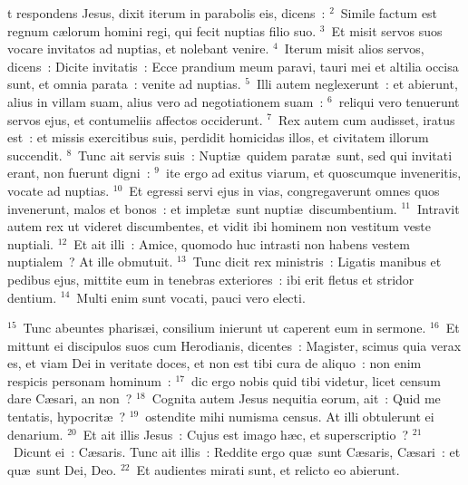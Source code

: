 \bchapter
{}t respondens Jesus, dixit iterum in parabolis eis, dicens~:
${}^{2}$~Simile factum est regnum c\ae lorum homini regi, qui fecit nuptias filio suo.
${}^{3}$~Et misit servos suos vocare invitatos ad nuptias, et nolebant venire.
${}^{4}$~Iterum misit alios servos, dicens~: Dicite invitatis~: Ecce prandium meum paravi, tauri mei et altilia occisa sunt, et omnia parata~: venite ad nuptias.
${}^{5}$~Illi autem neglexerunt~: et abierunt, alius in villam suam, alius vero ad negotiationem suam~:
${}^{6}$~reliqui vero tenuerunt servos ejus, et contumeliis affectos occiderunt.
${}^{7}$~Rex autem cum audisset, iratus est~: et missis exercitibus suis, perdidit homicidas illos, et civitatem illorum succendit.
${}^{8}$~Tunc ait servis suis~: Nupti\ae\ quidem parat\ae\ sunt, sed qui invitati erant, non fuerunt digni~:
${}^{9}$~ite ergo ad exitus viarum, et quoscumque inveneritis, vocate ad nuptias.
${}^{10}$~Et egressi servi ejus in vias, congregaverunt omnes quos invenerunt, malos et bonos~: et implet\ae\ sunt nupti\ae\ discumbentium.
${}^{11}$~Intravit autem rex ut videret discumbentes, et vidit ibi hominem non vestitum veste nuptiali.
${}^{12}$~Et ait illi~: Amice, quomodo huc intrasti non habens vestem nuptialem~? At ille obmutuit.
${}^{13}$~Tunc dicit rex ministris~: Ligatis manibus et pedibus ejus, mittite eum in tenebras exteriores~: ibi erit fletus et stridor dentium.
${}^{14}$~Multi enim sunt vocati, pauci vero electi.


${}^{15}$~Tunc abeuntes pharis\ae i, consilium inierunt ut caperent eum in sermone.
${}^{16}$~Et mittunt ei discipulos suos cum Herodianis, dicentes~: Magister, scimus quia verax es, et viam Dei in veritate doces, et non est tibi cura de aliquo~: non enim respicis personam hominum~:
${}^{17}$~dic ergo nobis quid tibi videtur, licet censum dare C\ae sari, an non~?
${}^{18}$~Cognita autem Jesus nequitia eorum, ait~: Quid me tentatis, hypocrit\ae~?
${}^{19}$~ostendite mihi numisma census. At illi obtulerunt ei denarium.
${}^{20}$~Et ait illis Jesus~: Cujus est imago h\ae c, et superscriptio~?
${}^{21}$~Dicunt ei~: C\ae saris. Tunc ait illis~: Reddite ergo qu\ae\ sunt C\ae saris, C\ae sari~: et qu\ae\ sunt Dei, Deo.
${}^{22}$~Et audientes mirati sunt, et relicto eo abierunt.


